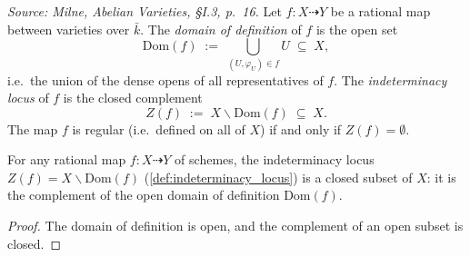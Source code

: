 \begin{definition}\leanok
  \label{def:indeterminacy_locus}
  \textit{Source: Milne, \emph{Abelian Varieties}, \S I.3, p.~16.}
  Let \(f \colon X \dashrightarrow Y\) be a rational map between varieties over \(\bar k\).
  The \emph{domain of definition} of \(f\) is the open set
  \[
    \mathrm{Dom}(f) \;:=\; \bigcup_{(U, \varphi_U) \in f} U \;\subseteq\; X,
  \]
  i.e.\ the union of the dense opens of all representatives of \(f\). The
  \emph{indeterminacy locus} of \(f\) is the closed complement
  \[
    Z(f) \;:=\; X \smallsetminus \mathrm{Dom}(f) \;\subseteq\; X.
  \]
  The map \(f\) is regular (i.e.\ defined on all of \(X\)) if and only if \(Z(f) = \emptyset\).
\end{definition}

\begin{lemma}
  \label{lem:isClosed_indeterminacy_locus}
  For any rational map \(f \colon X \dashrightarrow Y\) of schemes, the
  indeterminacy locus \(Z(f) = X \smallsetminus \mathrm{Dom}(f)\)
  (\cref{def:indeterminacy_locus}) is a closed subset of \(X\): it is the
  complement of the open domain of definition \(\mathrm{Dom}(f)\).
\end{lemma}

\begin{proof}
  The domain of definition is open, and the complement of an open subset is closed.
\end{proof}

